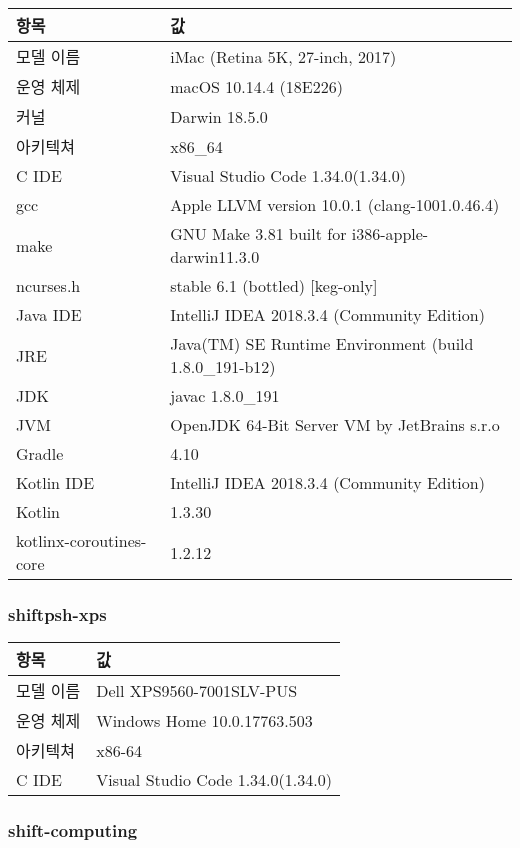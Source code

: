 \begin{tabularx}{\linewidth}{l|X}
    항목 & 값 \\
    \hline
    모델 이름 & iMac (Retina 5K, 27-inch, 2017) \\
    \hline
    운영 체제 & macOS 10.14.4 (18E226) \\
    커널 & Darwin 18.5.0 \\
    아키텍쳐 & x86_64 \\
    \hline
    C IDE & Visual Studio Code 1.34.0(1.34.0) \\
    gcc & Apple LLVM version 10.0.1 (clang-1001.0.46.4) \\
    make & GNU Make 3.81 built for i386-apple-darwin11.3.0 \\
    ncurses.h & stable 6.1 (bottled) [keg-only] \\
    \hline
    Java IDE & IntelliJ IDEA 2018.3.4 (Community Edition) \\
    JRE & Java(TM) SE Runtime Environment (build 1.8.0_191-b12) \\
    JDK & javac 1.8.0_191 \\
    JVM & OpenJDK 64-Bit Server VM by JetBrains s.r.o \\
    Gradle & 4.10 \\
    \hline
    Kotlin IDE & IntelliJ IDEA 2018.3.4 (Community Edition) \\
    Kotlin & 1.3.30 \\
    kotlinx-coroutines-core & 1.2.12 \\
\end{tabularx}

\subsubsection{shiftpsh-xps}\hfill

\begin{tabularx}{\linewidth}{l|X}
    항목 & 값 \\
    \hline
    모델 이름 & Dell XPS9560-7001SLV-PUS \\
    \hline
    운영 체제 & Windows Home 10.0.17763.503 \\
    아키텍쳐 & x86-64 \\
    \hline
    C IDE & Visual Studio Code 1.34.0(1.34.0) \\
\end{tabularx}

\newpage

\subsubsection{shift-computing}\hfill

